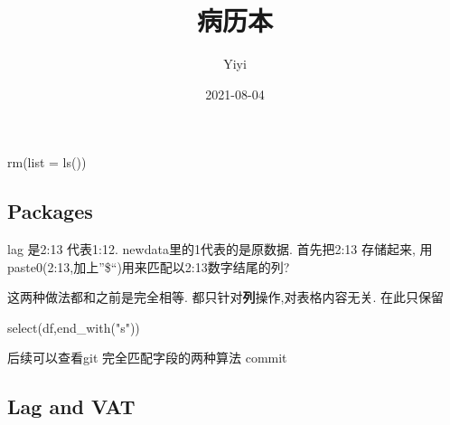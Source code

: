 \documentclass[
]{article}
\title{病历本}
\author{Yiyi}
\date{2021-08-04}
\newenvironment{Shaded}{\begin{snugshade}}{\end{snugshade}}
\newcommand{\AttributeTok}[1]{\textcolor[rgb]{0.77,0.63,0.00}{#1}}
\newcommand{\FunctionTok}[1]{\textcolor[rgb]{0.00,0.00,0.00}{#1}}
\newcommand{\NormalTok}[1]{#1}
\newcommand{\SpecialCharTok}[1]{\textcolor[rgb]{0.00,0.00,0.00}{#1}}
\newcommand{\StringTok}[1]{\textcolor[rgb]{0.31,0.60,0.02}{#1}}
\begin{document}
\maketitle

{
\setcounter{tocdepth}{3}
\tableofcontents
}
\hypertarget{section}{%
\section{}\label{section}}

\begin{Shaded}
\begin{Highlighting}[]
 \FunctionTok{rm}\NormalTok{(}\AttributeTok{list =} \FunctionTok{ls}\NormalTok{())}
\end{Highlighting}
\end{Shaded}

\hypertarget{packages}{%
\subsection{Packages}\label{packages}}

lag 是2:13 代表1:12. newdata里的1代表的是原数据. 首先把2:13 存储起来,
用paste0(2:13,加上''\$``)用来匹配以2:13数字结尾的列?

\begin{Shaded}
\end{Shaded}

这两种做法都和之前是完全相等. 都只针对\textbf{列}操作,对表格内容无关.
在此只保留

\begin{Shaded}
\begin{Highlighting}[]
\FunctionTok{select}\NormalTok{(df,}\FunctionTok{end\_with}\NormalTok{(}\StringTok{"s"}\NormalTok{))}
\end{Highlighting}
\end{Shaded}

后续可以查看git 完全匹配字段的两种算法 commit

\hypertarget{lag-and-vat}{%
\subsection{Lag and VAT}\label{lag-and-vat}}
\end{document}
